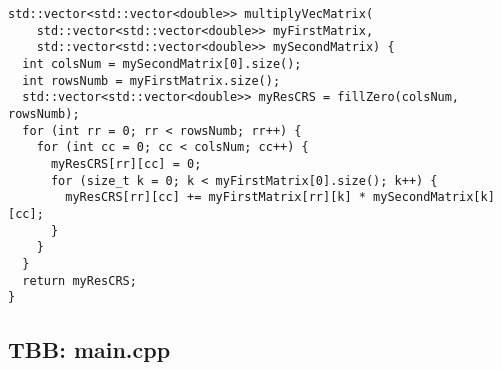 \documentclass[14pt, russian]{extarticle}
\begin{document}
\begin{lstlisting}
std::vector<std::vector<double>> multiplyVecMatrix(
    std::vector<std::vector<double>> myFirstMatrix,
    std::vector<std::vector<double>> mySecondMatrix) {
  int colsNum = mySecondMatrix[0].size();
  int rowsNumb = myFirstMatrix.size();
  std::vector<std::vector<double>> myResCRS = fillZero(colsNum, rowsNumb);
  for (int rr = 0; rr < rowsNumb; rr++) {
    for (int cc = 0; cc < colsNum; cc++) {
      myResCRS[rr][cc] = 0;
      for (size_t k = 0; k < myFirstMatrix[0].size(); k++) {
        myResCRS[rr][cc] += myFirstMatrix[rr][k] * mySecondMatrix[k][cc];
      }
    }
  }
  return myResCRS;
}

	\end{lstlisting}
	\newpage
	
	\subsection{TBB: main.cpp}
\end{document}
